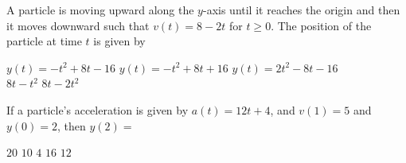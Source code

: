 \begin{questions}
    \question A particle is moving upward along the $y$-axis until it reaches the origin and then it moves downward such that $v(t) = 8 - 2t$ for $t \geq 0$. The position of the particle at time $t$ is given by \\

    \begin{oneparchoices}
        \choice $y(t) = -t^2 + 8t - 16$ 
        \choice $y(t) = -t^2 + 8t + 16$
        \choice $y(t) = 2t^2 - 8t - 16$ \\[11pt]
        \makebox[0.27\textwidth] \choice $8t - t^2$
        \makebox[0.28\textwidth] \choice $8t - 2t^2$
    \end{oneparchoices} \par \horizontalline

    \question If a particle's acceleration is given by $a(t) = 12t + 4$, and $v(1) = 5$ and $y(0) = 2$, then $y(2) = $ \\

    \begin{oneparchoices}
        \choice $20$
        \choice $10$
        \choice $4$
        \choice $16$
        \choice $12$
    \end{oneparchoices} \par \horizontalline
\end{questions}